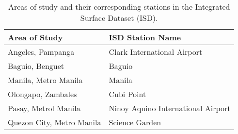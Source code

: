 	\begin{table}	
		\caption{Areas of study and their corresponding stations in the Integrated Surface Dataset (ISD).}
		\label{tab:isd-stations}
		\centering
		\begin{tabular}{ll}
			\hline \hline
			Area of Study             & ISD Station Name                       \\
			\hline
			Angeles, Pampanga         & Clark International Airport        \\
			Baguio, Benguet           & Baguio                             \\
			Manila, Metro Manila      & Manila                             \\
			Olongapo, Zambales        & Cubi Point                         \\
			Pasay, Metrol Manila      & Ninoy Aquino International Airport \\
			Quezon City, Metro Manila & Science Garden \\                   
			\hline
		\end{tabular}	
	\end{table}

